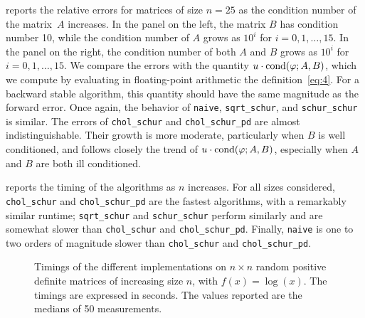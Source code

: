 \documentclass[DIV=14]{scrartcl}
\newcommand\alttext[1]{
\useasboundingbox (current bounding box);
\draw let
  \p1 = (current bounding box.south west),
  \p2 = (current bounding box.north east)
  in node at (current bounding box.center)
    {\pdftooltip{\phantom{\rule{\dimexpr\x2-\x1\relax}{\dimexpr\y2-\y1\relax}}}{#1}};}
\theoremstyle{thmstyletwo}
\theoremstyle{definition}
\numberwithin{equation}{section}
\newcommand{\algnaive}{\texttt{naive}}
\newcommand{\algss}{\texttt{sqrt\_schur}}
\newcommand{\algsc}{\texttt{chol\_schur}}
\newcommand{\algscp}{\texttt{chol\_schur\_pd}}
\newcommand{\algscsc}{\texttt{schur\_schur}}
\begin{document}
{ reports the relative errors for matrices of size $n=25$ as the condition number of the matrix~$A$ increases. In the panel on the left, the matrix $B$ has condition number 10, while the condition number of $A$ grows as $10^i$ for $i=0,1,\ldots,15$.
In the panel on the right, the condition number of both $A$ and $B$ grows as $10^i$ for $i=0,1,\ldots,15$.
We compare the errors with the quantity $u\cdot \hbox{cond}(\varphi; A, B)$, which we compute by evaluating in floating-point arithmetic the definition~\eqref{eq:4}. For a backward stable algorithm, this quantity should have the same magnitude as the forward error.
Once again, the behavior of \algnaive{},
 \algss{}, and \algscsc{} is similar.
The errors of \algsc{} and
\algscp{} are almost indistinguishable. Their growth is more moderate, particularly when $B$ is well conditioned, and follows closely the trend of $u\cdot \hbox{cond}(\varphi; A, B)$, especially when $A$ and $B$ are both ill conditioned.

 reports the timing of the algorithms as $n$ increases.
For all sizes considered, \algsc{} and \algscp{} are the fastest algorithms, with a remarkably similar runtime;
\algss{} and \algscsc{} perform similarly and are somewhat slower than \algsc{} and \algscp{}. Finally, \algnaive{} is one to two orders of magnitude slower than \algsc{} and \algscp{}.


\begin{figure}
    \centering

    \caption{Timings of the different implementations on $n\times n$ random positive definite matrices of increasing size $n$, with $f(x)=\log(x)$. The timings are expressed in seconds. The values reported are the medians of 50 measurements.}
    \label{fig:3}
\end{figure}

}
\end{document}
